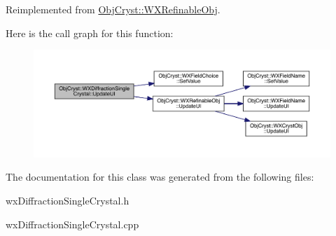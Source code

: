 Reimplemented from \mbox{\hyperlink{class_obj_cryst_1_1_w_x_refinable_obj_acbf70975a79661a73a1ae3c39c9c3045}{Obj\+Cryst\+::\+W\+X\+Refinable\+Obj}}.

Here is the call graph for this function\+:
\nopagebreak
\begin{figure}[H]
\begin{center}
\leavevmode
\includegraphics[width=350pt]{class_obj_cryst_1_1_w_x_diffraction_single_crystal_a2b8ef5fa0663d1526258a17498e9b0fc_cgraph}
\end{center}
\end{figure}


The documentation for this class was generated from the following files\+:\begin{DoxyCompactItemize}
\item 
wx\+Diffraction\+Single\+Crystal.\+h\item 
wx\+Diffraction\+Single\+Crystal.\+cpp\end{DoxyCompactItemize}
